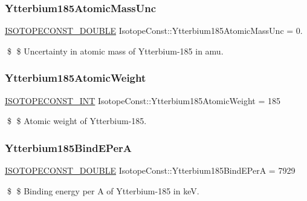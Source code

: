 \subsubsection{\texorpdfstring{Ytterbium185\+Atomic\+Mass\+Unc}{Ytterbium185AtomicMassUnc}}
{\footnotesize\ttfamily \mbox{\hyperlink{group___isotope_const-_macros_ga8f45a7272ce02c0b4c65c44636ed719a}{I\+S\+O\+T\+O\+P\+E\+C\+O\+N\+S\+T\+\_\+\+D\+O\+U\+B\+LE}} Isotope\+Const\+::\+Ytterbium185\+Atomic\+Mass\+Unc = 0.}

\$ \$ Uncertainty in atomic mass of Ytterbium-\/185 in amu. \mbox{\label{group___isotope_const-_ytterbium-_yb185_gaaf62b395dc11be7e381138bfc9f4c618}} 
\subsubsection{\texorpdfstring{Ytterbium185\+Atomic\+Weight}{Ytterbium185AtomicWeight}}
{\footnotesize\ttfamily \mbox{\hyperlink{group___isotope_const-_macros_ga5f18360b3e99483a35c32d789e62621c}{I\+S\+O\+T\+O\+P\+E\+C\+O\+N\+S\+T\+\_\+\+I\+NT}} Isotope\+Const\+::\+Ytterbium185\+Atomic\+Weight = 185}

\$ \$ Atomic weight of Ytterbium-\/185. \mbox{\label{group___isotope_const-_ytterbium-_yb185_ga378e1198d6ea0836e1f8b2474cabb8aa}} 
\subsubsection{\texorpdfstring{Ytterbium185\+Bind\+E\+PerA}{Ytterbium185BindEPerA}}
{\footnotesize\ttfamily \mbox{\hyperlink{group___isotope_const-_macros_ga8f45a7272ce02c0b4c65c44636ed719a}{I\+S\+O\+T\+O\+P\+E\+C\+O\+N\+S\+T\+\_\+\+D\+O\+U\+B\+LE}} Isotope\+Const\+::\+Ytterbium185\+Bind\+E\+PerA = 7929}

\$ \$ Binding energy per A of Ytterbium-\/185 in keV. \mbox{\label{group___isotope_const-_ytterbium-_yb185_gaa4576585affed54e1137ede6bd4985eb}} 
